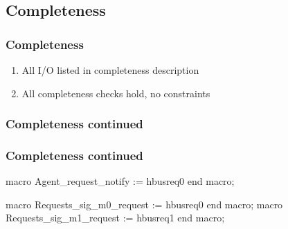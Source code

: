 \documentclass[]{beamer}
\begin{document}
\begin{frame}
\begin{columns}
           \end{columns}
         \end{frame}


       \subsection{Completeness}
       \begin{frame}
        \frametitle{Completeness}
          \begin{enumerate}
              \item<1-> All I/O listed in completeness description
              \item<1-> All completeness checks hold, no constraints
          \end{enumerate}
       \end{frame}

       \begin{frame}
         \frametitle{Completeness continued}
           \begin{center}
           \end{center}

       \end{frame}
       \begin{frame}[fragile]
         \frametitle{Completeness continued}
       \begin{VHI}
macro Agent_request_notify := hbusreq0 end macro;
 

macro Requests_sig_m0_request := hbusreq0 end macro;
macro Requests_sig_m1_request := hbusreq1 end macro;
       \end{VHI}
       \end{frame}
\end{document}
